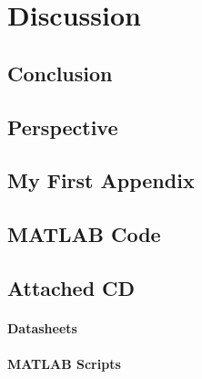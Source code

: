 \part{Discussion}\label{part:part3}
\chapter{Conclusion}\label{chap:conclusion}
		
\chapter{Perspective}\label{chap:perspektivering}	
		

\begingroup
	\raggedright
	\clearpage
{}

	
\endgroup
\label{sourceliste}

\newpage

\begin{appendices}
\appendix
\renewcommand{\appendixname}{Appendix}
\renewcommand{\appendixtocname}{Appendix}
	
\chapter{My First Appendix}\label{app:vest}

\chapter{MATLAB Code}\label{app:source}

\chapter{Attached CD} \label{chap:cd}
	\subsection*{Datasheets}
	\subsection*{MATLAB Scripts}

\end{appendices}
